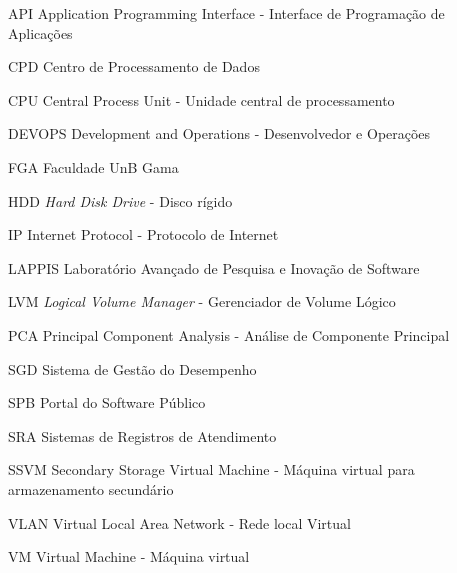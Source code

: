 \begin{siglas}
  
  \item [API] Application Programming Interface - Interface de Programação de Aplicações 
  \item [CPD] Centro de Processamento de Dados
  \item [CPU] Central Process Unit - Unidade central de processamento
  \item[DEVOPS] Development and Operations - Desenvolvedor e Operações
  \item[FGA] Faculdade UnB Gama
  \item[HDD] \textit{Hard Disk Drive} - Disco rígido
  \item[IP] Internet Protocol - Protocolo de Internet
  \item[LAPPIS] Laboratório Avançado de Pesquisa e Inovação de Software
  \item[LVM] \textit{Logical Volume Manager} - Gerenciador de Volume Lógico
  \item [PCA] Principal Component Analysis - Análise de Componente Principal
  \item[SGD] Sistema de Gestão do Desempenho
  \item[SPB] Portal do Software Público
  \item[SRA] Sistemas de Registros de Atendimento
  \item [SSVM] Secondary Storage Virtual Machine - Máquina virtual para armazenamento secundário  
  \item[VLAN] Virtual Local Area Network - Rede local Virtual
  \item[VM] Virtual Machine - Máquina virtual

  
  
 
 
  
\end{siglas}
